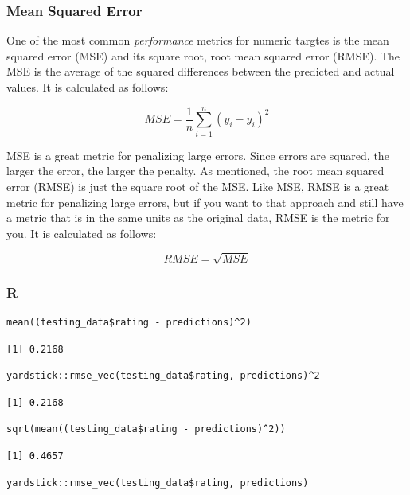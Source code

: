 \documentclass[
  letterpaper,
]{krantz}
\begin{document}
\subsubsection{Mean Squared Error}\label{sec-knowing-metrics-mse}

One of the most common \emph{performance} metrics for numeric targtes is
the mean squared error (MSE) and its square root, root mean squared
error (RMSE). The MSE is the average of the squared differences between
the predicted and actual values. It is calculated as follows:

\[MSE = \frac{1}{n}\sum_{i=1}^{n}(y_i - \hat{y}_i)^2\]

MSE is a great metric for penalizing large errors. Since errors are
squared, the larger the error, the larger the penalty. As mentioned, the
root mean squared error (RMSE) is just the square root of the MSE. Like
MSE, RMSE is a great metric for penalizing large errors, but if you want
to that approach and still have a metric that is in the same units as
the original data, RMSE is the metric for you. It is calculated as
follows:

\[RMSE = \sqrt{MSE}\]

\subsubsection{R}

\begin{verbatim}
mean((testing_data$rating - predictions)^2)
\end{verbatim}

\begin{verbatim}
[1] 0.2168
\end{verbatim}

\begin{verbatim}
yardstick::rmse_vec(testing_data$rating, predictions)^2
\end{verbatim}

\begin{verbatim}
[1] 0.2168
\end{verbatim}

\begin{verbatim}
sqrt(mean((testing_data$rating - predictions)^2))
\end{verbatim}

\begin{verbatim}
[1] 0.4657
\end{verbatim}

\begin{verbatim}
yardstick::rmse_vec(testing_data$rating, predictions)
\end{verbatim}
\end{document}
